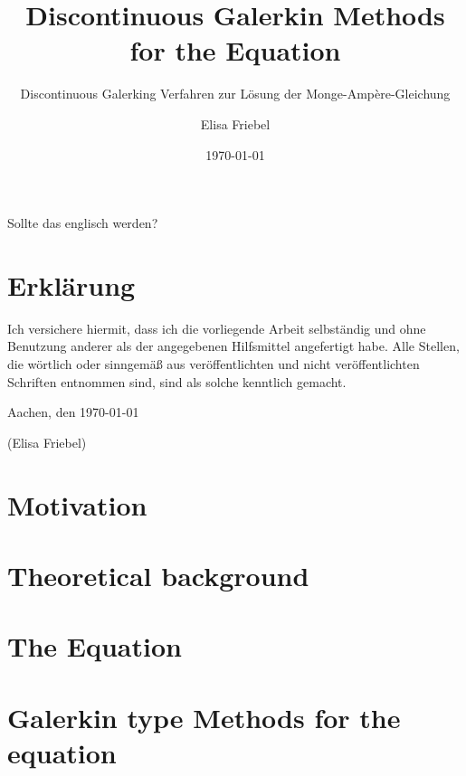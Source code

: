 \documentclass{template}
\title{Discontinuous Galerkin Methods for the \MA Equation}
\subtitle{\Large Discontinuous Galerking Verfahren zur Lösung der Monge-Amp\`ere-Gleichung}
\author{Elisa Friebel} %
\date{\today}
\begin{document}
\maketitle

\begin{center}
\begin{minipage}[t]{0.8\textwidth}

Sollte das englisch werden?
\chapter*{Erklärung}
Ich versichere hiermit, dass ich die vorliegende Arbeit selbständig und
ohne Benutzung anderer als der angegebenen Hilfsmittel angefertigt habe.
Alle Stellen, die wörtlich oder sinngemäß aus veröffentlichten und nicht
veröffentlichten Schriften entnommen sind, sind als solche kenntlich
gemacht.

\vspace{1cm}
Aachen, den \today

\vspace{2cm}
(Elisa Friebel)
\end{minipage}
\end{center}
\thispagestyle{empty}
\cleardoublepage

\tableofcontents{}

\setcounter{page}{1}


\chapter{Motivation}
\label{ch:leitung}

\chapter{Theoretical background}
\label{ch:TheoreticalBackground}



\chapter{The \MA Equation}
\label{ch:MongeAmpereEq}



\chapter{Galerkin type Methods for the \MA equation}
\label{ch:DGMongeAmpere}

\end{document}
